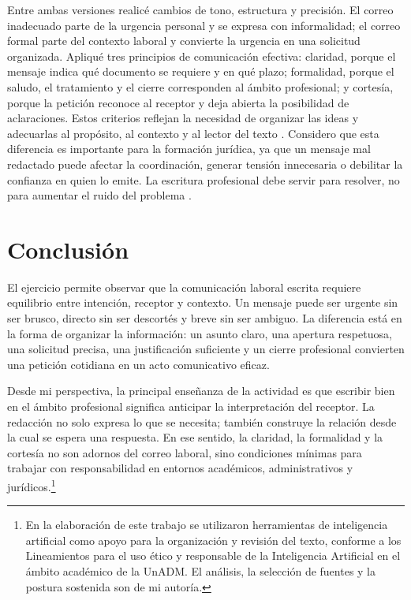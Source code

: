 \documentclass[
	spanish,
	letterpaper, oneside
]{article}
\begin{document}
	Entre ambas versiones realicé cambios de tono, estructura y precisión. El correo inadecuado parte de la urgencia personal y se expresa con informalidad; el correo formal parte del contexto laboral y convierte la urgencia en una solicitud organizada. Apliqué tres principios de comunicación efectiva: claridad, porque el mensaje indica qué documento se requiere y en qué plazo; formalidad, porque el saludo, el tratamiento y el cierre corresponden al ámbito profesional; y cortesía, porque la petición reconoce al receptor y deja abierta la posibilidad de aclaraciones. Estos criterios reflejan la necesidad de organizar las ideas y adecuarlas al propósito, al contexto y al lector del texto \citep{nunezcortesEscrituraAcademicaTeoria2015,vitoriaEscrituraAcademicaFormacion2019}. Considero que esta diferencia es importante para la formación jurídica, ya que un mensaje mal redactado puede afectar la coordinación, generar tensión innecesaria o debilitar la confianza en quien lo emite. La escritura profesional debe servir para resolver, no para aumentar el ruido del problema \citep{ayalaTallerLecturaRedaccion2010}.

\section{Conclusión}

El ejercicio permite observar que la comunicación laboral escrita requiere equilibrio entre intención, receptor y contexto. Un mensaje puede ser urgente sin ser brusco, directo sin ser descortés y breve sin ser ambiguo. La diferencia está en la forma de organizar la información: un asunto claro, una apertura respetuosa, una solicitud precisa, una justificación suficiente y un cierre profesional convierten una petición cotidiana en un acto comunicativo eficaz.

Desde mi perspectiva, la principal enseñanza de la actividad es que escribir bien en el ámbito profesional significa anticipar la interpretación del receptor. La redacción no solo expresa lo que se necesita; también construye la relación desde la cual se espera una respuesta. En ese sentido, la claridad, la formalidad y la cortesía no son adornos del correo laboral, sino condiciones mínimas para trabajar con responsabilidad en entornos académicos, administrativos y jurídicos.\footnote{En la elaboración de este trabajo se utilizaron herramientas de inteligencia artificial como apoyo para la organización y revisión del texto, conforme a los Lineamientos para el uso ético y responsable de la Inteligencia Artificial en el ámbito académico de la UnADM. El análisis, la selección de fuentes y la postura sostenida son de mi autoría.}


\end{document}
